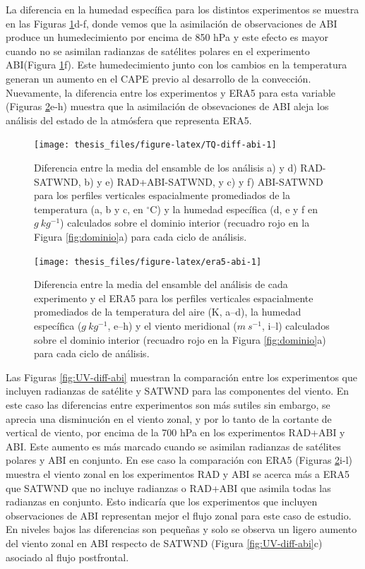\documentclass[12pt,oneside,a4paper]{reedthesis}
\begin{document}
La diferencia en la humedad específica para los distintos experimentos se muestra en las Figuras \ref{fig:TQ-diff-abi}d-f, donde vemos que la asimilación de observaciones de ABI produce un humedecimiento por encima de 850 hPa y este efecto es mayor cuando no se asimilan radianzas de satélites polares en el experimento ABI(Figura \ref{fig:TQ-diff-abi}f). Este humedecimiento junto con los cambios en la temperatura generan un aumento en el CAPE previo al desarrollo de la convección. Nuevamente, la diferencia entre los experimentos y ERA5 para esta variable (Figuras \ref{fig:era5-abi}e-h) muestra que la asimilación de obsevaciones de ABI aleja los análisis del estado de la atmósfera que representa ERA5.


\begin{figure}

{\centering \texttt{[image: thesis\_files/figure-latex/TQ-diff-abi-1]} 

}

\caption{Diferencia entre la media del ensamble de los análisis a) y d) RAD-SATWND, b) y e) RAD+ABI-SATWND, y c) y f) ABI-SATWND para los perfiles verticales espacialmente promediados de la temperatura (a, b y c, en \(^\circ\)C) y la humedad específica (d, e y f en \(g\ kg^{-1}\)) calculados sobre el dominio interior (recuadro rojo en la Figura \ref{fig:dominio}a) para cada ciclo de análisis.}\label{fig:TQ-diff-abi}
\end{figure}

\begin{figure}

{\centering \texttt{[image: thesis\_files/figure-latex/era5-abi-1]} 

}

\caption{Diferencia entre la media del ensamble del análisis de cada experimento y el ERA5 para los perfiles verticales espacialmente promediados de la temperatura del aire (K, a--d), la humedad específica (\(g\ kg^{-1}\), e--h) y el viento meridional (\(m\ s^{-1}\), i--l) calculados sobre el dominio interior (recuadro rojo en la Figura \ref{fig:dominio}a) para cada ciclo de análisis.}\label{fig:era5-abi}
\end{figure}
Las Figuras \ref{fig:UV-diff-abi} muestran la comparación entre los experimentos que incluyen radianzas de satélite y SATWND para las componentes del viento. En este caso las diferencias entre experimentos son más sutiles sin embargo, se aprecia una disminución en el viento zonal, y por lo tanto de la cortante de vertical de viento, por encima de la 700 hPa en los experimentos RAD+ABI y ABI. Este aumento es más marcado cuando se asimilan radianzas de satélites polares y ABI en conjunto. En ese caso la comparación con ERA5 (Figuras \ref{fig:era5-abi}i-l) muestra el viento zonal en los experimentos RAD y ABI se acerca más a ERA5 que SATWND que no incluye radianzas o RAD+ABI que asimila todas las radianzas en conjunto. Esto indicaría que los experimentos que incluyen observaciones de ABI representan mejor el flujo zonal para este caso de estudio. En niveles bajos las diferencias son pequeñas y solo se observa un ligero aumento del viento zonal en ABI respecto de SATWND (Figura \ref{fig:UV-diff-abi}c) asociado al flujo postfrontal.
\end{document}
